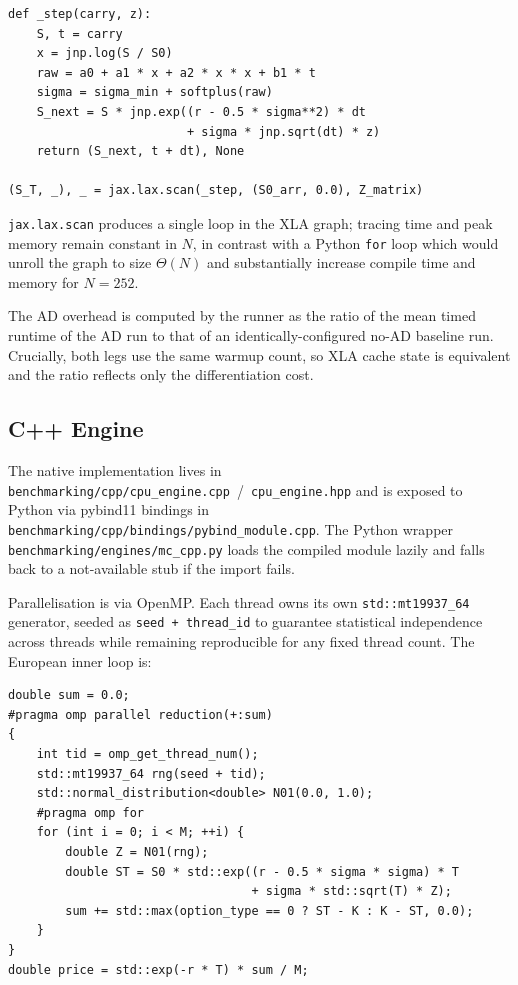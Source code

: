 \begin{verbatim}
def _step(carry, z):
    S, t = carry
    x = jnp.log(S / S0)
    raw = a0 + a1 * x + a2 * x * x + b1 * t
    sigma = sigma_min + softplus(raw)
    S_next = S * jnp.exp((r - 0.5 * sigma**2) * dt
                         + sigma * jnp.sqrt(dt) * z)
    return (S_next, t + dt), None

(S_T, _), _ = jax.lax.scan(_step, (S0_arr, 0.0), Z_matrix)
\end{verbatim}

\texttt{jax.lax.scan} produces a single loop in the XLA graph; tracing time and
peak memory remain constant in $N$, in contrast with a Python \texttt{for} loop
which would unroll the graph to size $\Theta(N)$ and substantially increase
compile time and memory for $N=252$.

The AD overhead is computed by the runner as the ratio of the mean timed
runtime of the AD run to that of an identically-configured no-AD baseline run.
Crucially, both legs use the same warmup count, so XLA cache state is
equivalent and the ratio reflects only the differentiation cost.

\subsection{C++ Engine}
\label{sec:impl-cpp}

The native implementation lives in
\texttt{benchmarking/cpp/cpu\_engine.cpp}~/~\texttt{cpu\_engine.hpp} and is exposed
to Python via pybind11 bindings in
\texttt{benchmarking/cpp/bindings/pybind\_module.cpp}. The Python wrapper
\texttt{benchmarking/engines/mc\_cpp.py} loads the compiled module lazily and
falls back to a not-available stub if the import fails.

Parallelisation is via OpenMP. Each thread owns its own
\texttt{std::mt19937\_64} generator, seeded as \texttt{seed + thread\_id} to
guarantee statistical independence across threads while remaining reproducible
for any fixed thread count. The European inner loop is:

\begin{verbatim}
double sum = 0.0;
#pragma omp parallel reduction(+:sum)
{
    int tid = omp_get_thread_num();
    std::mt19937_64 rng(seed + tid);
    std::normal_distribution<double> N01(0.0, 1.0);
    #pragma omp for
    for (int i = 0; i < M; ++i) {
        double Z = N01(rng);
        double ST = S0 * std::exp((r - 0.5 * sigma * sigma) * T
                                  + sigma * std::sqrt(T) * Z);
        sum += std::max(option_type == 0 ? ST - K : K - ST, 0.0);
    }
}
double price = std::exp(-r * T) * sum / M;
\end{verbatim}

